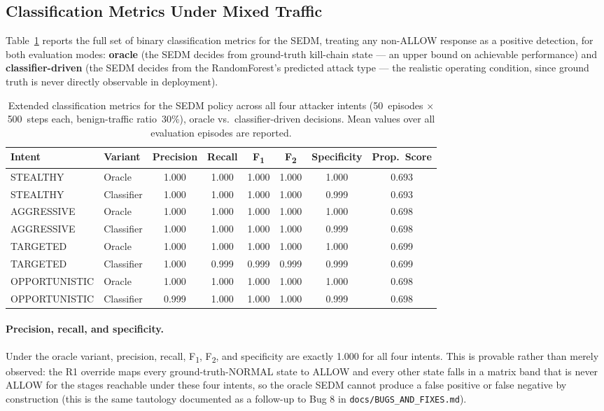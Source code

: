 \subsection{Classification Metrics Under Mixed Traffic}

Table~\ref{tab:sedm_extended_metrics} reports the full set of binary
classification metrics for the SEDM, treating any non-ALLOW response as a
positive detection, for both evaluation modes: \textbf{oracle} (the SEDM
decides from ground-truth kill-chain state — an upper bound on achievable
performance) and \textbf{classifier-driven} (the SEDM decides from the
RandomForest's predicted attack type — the realistic operating condition,
since ground truth is never directly observable in deployment).

\begin{table}[ht]
  \centering
  \caption{Extended classification metrics for the SEDM policy across all
           four attacker intents (50~episodes $\times$ 500~steps each,
           benign-traffic ratio~30\%), oracle vs.\ classifier-driven decisions.
           Mean values over all evaluation episodes are reported.}
  \label{tab:sedm_extended_metrics}
  \begin{tabular}{llcccccc}
    \toprule
    Intent & Variant & Precision & Recall & F\textsubscript{1} & F\textsubscript{2} & Specificity & Prop.\ Score \\
    \midrule
    STEALTHY      & Oracle     & 1.000 & 1.000 & 1.000 & 1.000 & 1.000 & 0.693 \\
    STEALTHY      & Classifier & 1.000 & 1.000 & 1.000 & 1.000 & 0.999 & 0.693 \\
    AGGRESSIVE    & Oracle     & 1.000 & 1.000 & 1.000 & 1.000 & 1.000 & 0.698 \\
    AGGRESSIVE    & Classifier & 1.000 & 1.000 & 1.000 & 1.000 & 0.999 & 0.698 \\
    TARGETED      & Oracle     & 1.000 & 1.000 & 1.000 & 1.000 & 1.000 & 0.699 \\
    TARGETED      & Classifier & 1.000 & 0.999 & 0.999 & 0.999 & 0.999 & 0.699 \\
    OPPORTUNISTIC & Oracle     & 1.000 & 1.000 & 1.000 & 1.000 & 1.000 & 0.698 \\
    OPPORTUNISTIC & Classifier & 0.999 & 1.000 & 1.000 & 1.000 & 0.999 & 0.698 \\
    \bottomrule
  \end{tabular}
\end{table}

\paragraph{Precision, recall, and specificity.}
Under the oracle variant, precision, recall, F\textsubscript{1}, F\textsubscript{2}, and
specificity are exactly 1.000 for all four intents. This is provable rather
than merely observed: the R1 override maps every ground-truth-NORMAL state
to ALLOW and every other state falls in a matrix band that is never ALLOW
for the stages reachable under these four intents, so the oracle SEDM cannot
produce a false positive or false negative by construction (this is the
same tautology documented as a follow-up to Bug 8 in
\texttt{docs/BUGS\_AND\_FIXES.md}).

